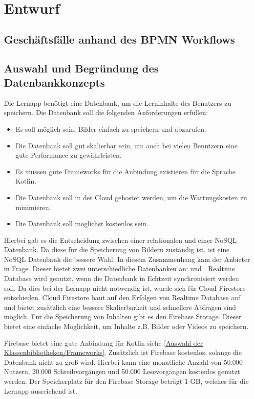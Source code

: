 \section{Entwurf}
\subsection{Geschäftsfälle anhand des BPMN Workflows}
\subsection{Auswahl und Begründung des Datenbankkonzepts}
Die Lernapp  benötigt eine Datenbank, um die Lerninhalte des Benutzers zu speichern. Die Datenbank soll die folgenden Anforderungen erfüllen:
\begin{itemize}
    \item Es soll möglich sein, Bilder einfach zu speichern und abzurufen.
    \item Die Datenbank soll gut skalierbar sein, um auch bei vielen Benutzern eine gute Performance zu gewährleisten.
    \item Es müssen gute Frameworks für die Anbindung existieren für die Sprache Kotlin.
    \item Die Datenbank soll in der Cloud gehostet werden, um die Wartungskosten zu minimieren.
    \item Die Datenbank soll möglichst kostenlos sein.
\end{itemize}

\noindent
Hierbei gab es die Entscheidung zwischen einer relationalen und einer NoSQL Datenbank. Da diese für die Speicherung von Bildern zuständig ist, ist eine NoSQL Datenbank die bessere Wahl. In diesem Zusammenhang kam der Anbieter  in Frage. Dieser bietet zwei unterschiedliche Datenbanken an:  und . Realtime Database wird genutzt, wenn die Datenbank in Echtzeit synchronisiert werden soll. Da dies bei der Lernapp nicht notwendig ist, wurde sich für Cloud Firestore entschieden. Cloud Firestore baut auf den Erfolgen von Realtime Database auf und bietet zusätzlich eine bessere Skalierbarkeit und schnellere Abfragen sind möglich. \cite*{Firestore} Für die Speicherung von Inhalten gibt es den Firebase Storage. Dieser bietet eine einfache Möglichkeit, um Inhalte z.B. Bilder oder Videos zu speichern. \newline

\noindent
Firebase bietet eine gute Anbindung für Kotlin siehe \ref*{Auswahl der Klassenbibliotheken/Frameworks}. Zusätzlich ist Firebase kostenlos, solange die Datenbank nicht zu groß wird. Hierbei kann eine monatliche Anzahl von 50.000 Nutzern, 20.000 Schreibvorgängen und 50.000 Lesevorgängen kostenlos genutzt werden. Der Speicherplatz für den Firebase Storage beträgt 1 GB, welches für die Lernapp ausreichend ist. \cite*{Firebase_Pricing}
